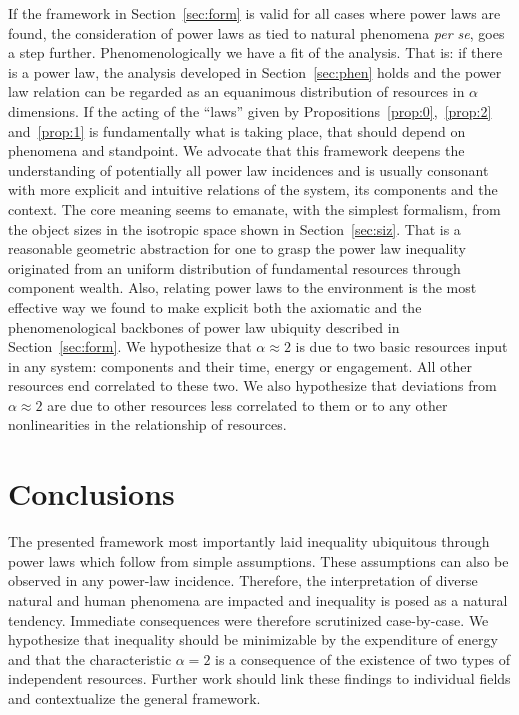 \documentclass[a4paper, 11pt]{article} %
\begin{document}
If the framework in Section~\ref{sec:form} is valid for all cases where power laws are found,
the consideration of power laws as tied to natural phenomena \emph{per se}, goes a step further. 
Phenomenologically we have a fit of the analysis.
That is: if there is
a power law, the analysis developed in Section~\ref{sec:phen} holds
and
the power law relation can be regarded as an equanimous distribution
of resources in $\alpha$ dimensions.
If the acting of the ``laws'' given by Propositions~\ref{prop:0},~\ref{prop:2} and~\ref{prop:1} is fundamentally what is taking place, that should depend on phenomena
and standpoint.
We advocate that this framework deepens the understanding of potentially all power law
incidences and is usually consonant with more explicit and intuitive 
relations of the system, its components and the context.
The core meaning seems to emanate, with the simplest formalism, from
the object sizes in the isotropic space shown in Section~\ref{sec:siz}.
That is a reasonable geometric abstraction for
one to grasp the power law inequality originated from
an uniform distribution
of fundamental resources through component wealth.
Also, relating power laws to the environment is the most effective
way we found to make explicit both the axiomatic
and the phenomenological backbones of power law ubiquity described in
Section~\ref{sec:form}.
We hypothesize that $\alpha \approx 2$ is due to two basic resources
input in any system: components and their time, energy or engagement.
All other resources end correlated to these two.
We also hypothesize that deviations from $\alpha \approx 2$ are due
to other resources less correlated to them
or to any other nonlinearities in the relationship of resources.

\section{Conclusions}
The presented framework 
most importantly laid inequality ubiquitous
through power laws which follow from simple assumptions.
These assumptions can also be observed in any power-law incidence.
Therefore, the interpretation of diverse natural and human phenomena 
are impacted and inequality is posed as a natural tendency.
Immediate consequences were therefore scrutinized case-by-case.
We hypothesize that
inequality should be minimizable by the expenditure of energy
and that the characteristic $\alpha=2$ is a consequence of
the existence of two types of independent resources.
Further work should link these findings to individual fields
and contextualize the general framework.
\end{document}
